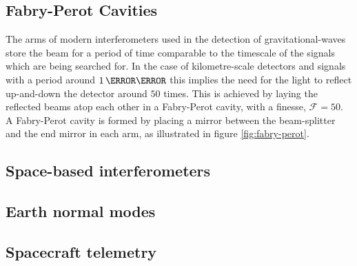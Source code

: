 \documentclass{kentigern}
\begin{document}
\subsection{Fabry-Perot Cavities}
\label{sec:fabry-perot-cavities}
%
%
The arms of modern interferometers used in the detection of
gravitational-waves store the beam for a period of time comparable to
the timescale of the signals which are being searched for. In the case
of kilometre-scale detectors and signals with a period around
$1\,\milli\second$ this implies the need for the light to reflect
up-and-down the detector around $50$ times. This is achieved by laying
the reflected beams atop each other in a Fabry-Perot cavity, with a
\gls{finesse}, $\mathcal{F}=50$. A Fabry-Perot cavity is formed by
placing a mirror between the beam-splitter and the end mirror in each
arm, as illustrated in figure \ref{fig:fabry-perot}.

\subsection{Space-based interferometers}
\label{sec:space-based-interf}

\subsection{Earth normal modes}
\label{sec:earth-normal-modes}

\subsection{Spacecraft telemetry}
\label{sec:spacecraft-telemetry}
\end{document}
